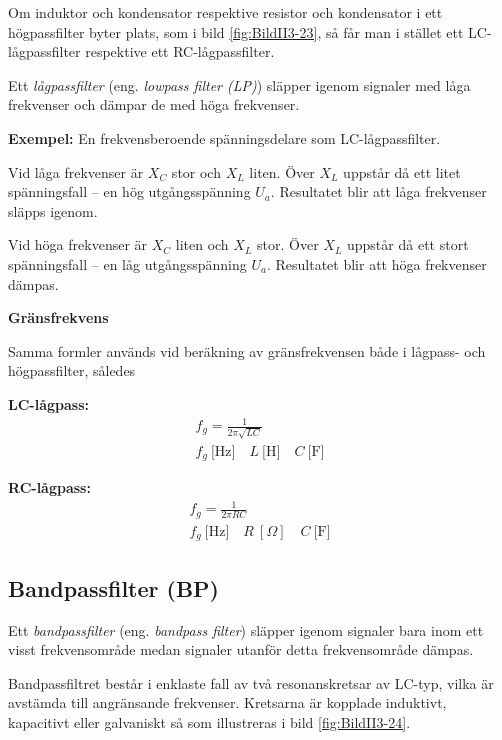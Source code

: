 Om induktor och kondensator respektive resistor och kondensator i ett
högpassfilter byter plats, som i bild \ref{fig:BildII3-23}, så får man i
stället ett LC-lågpassfilter respektive ett RC-lågpassfilter.

Ett \emph{lågpassfilter} (eng. \emph{lowpass filter (LP)}) släpper igenom
signaler med låga frekvenser och dämpar de med höga frekvenser.

\textbf{Exempel:} En frekvensberoende spänningsdelare som LC-lågpassfilter.

Vid låga frekvenser är \(X_C\) stor och \(X_L\) liten.
Över \(X_L\) uppstår då ett litet spänningsfall -- en hög utgångsspänning
\(U_a\).
Resultatet blir att låga frekvenser släpps igenom.

Vid höga frekvenser är \(X_C\) liten och \(X_L\) stor.
Över \(X_L\) uppstår då ett stort spänningsfall -- en låg utgångsspänning
\(U_a\).
Resultatet blir att höga frekvenser dämpas.

\textbf{Gränsfrekvens}

Samma formler används vid beräkning av gränsfrekvensen både i lågpass- och
högpassfilter, således

\textbf{LC-lågpass:}
\begin{gather*}
  f_g = \frac{1}{2\pi \sqrt{LC}} \\
  f_g\ \text{[Hz]} \quad L\ \text{[H]} \quad C\ \text{[F]}
\end{gather*}

\textbf{RC-lågpass:}
\begin{gather*}
  f_g = \frac{1}{2\pi {RC}} \\
  f_g\ \text{[Hz]} \quad R\ [\Omega] \quad C\ \text{[F]}
\end{gather*}

\subsection{Bandpassfilter (BP)}


Ett \emph{bandpassfilter} (eng. \emph{bandpass filter}) släpper igenom signaler
bara inom ett visst frekvensområde medan signaler utanför detta frekvensområde dämpas.

Bandpassfiltret består i enklaste fall av två resonanskretsar av LC-typ, vilka
är avstämda till angränsande frekvenser. Kretsarna är kopplade induktivt,
kapacitivt eller galvaniskt så som illustreras i bild \ref{fig:BildII3-24}.

